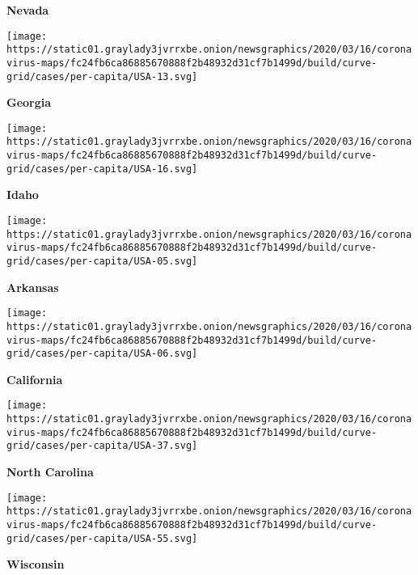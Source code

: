 \textbf{Nevada}

\href{https://www.nytimes3xbfgragh.onion/interactive/2020/us/georgia-coronavirus-cases.html}{}

\texttt{[image: https://static01.graylady3jvrrxbe.onion/newsgraphics/2020/03/16/coronavirus-maps/fc24fb6ca86885670888f2b48932d31cf7b1499d/build/curve-grid/cases/per-capita/USA-13.svg]}

\textbf{Georgia}

\href{https://www.nytimes3xbfgragh.onion/interactive/2020/us/idaho-coronavirus-cases.html}{}

\texttt{[image: https://static01.graylady3jvrrxbe.onion/newsgraphics/2020/03/16/coronavirus-maps/fc24fb6ca86885670888f2b48932d31cf7b1499d/build/curve-grid/cases/per-capita/USA-16.svg]}

\textbf{Idaho}

\href{https://www.nytimes3xbfgragh.onion/interactive/2020/us/arkansas-coronavirus-cases.html}{}

\texttt{[image: https://static01.graylady3jvrrxbe.onion/newsgraphics/2020/03/16/coronavirus-maps/fc24fb6ca86885670888f2b48932d31cf7b1499d/build/curve-grid/cases/per-capita/USA-05.svg]}

\textbf{Arkansas}

\href{https://www.nytimes3xbfgragh.onion/interactive/2020/us/california-coronavirus-cases.html}{}

\texttt{[image: https://static01.graylady3jvrrxbe.onion/newsgraphics/2020/03/16/coronavirus-maps/fc24fb6ca86885670888f2b48932d31cf7b1499d/build/curve-grid/cases/per-capita/USA-06.svg]}

\textbf{California}

\href{https://www.nytimes3xbfgragh.onion/interactive/2020/us/north-carolina-coronavirus-cases.html}{}

\texttt{[image: https://static01.graylady3jvrrxbe.onion/newsgraphics/2020/03/16/coronavirus-maps/fc24fb6ca86885670888f2b48932d31cf7b1499d/build/curve-grid/cases/per-capita/USA-37.svg]}

\textbf{North Carolina}

\href{https://www.nytimes3xbfgragh.onion/interactive/2020/us/wisconsin-coronavirus-cases.html}{}

\texttt{[image: https://static01.graylady3jvrrxbe.onion/newsgraphics/2020/03/16/coronavirus-maps/fc24fb6ca86885670888f2b48932d31cf7b1499d/build/curve-grid/cases/per-capita/USA-55.svg]}

\textbf{Wisconsin}

\href{https://www.nytimes3xbfgragh.onion/interactive/2020/us/iowa-coronavirus-cases.html}{}

